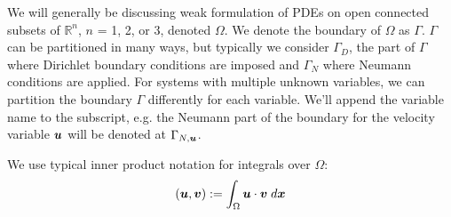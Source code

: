 We will generally be discussing weak formulation of PDEs on open
connected subsets of $\mathbb{R}^n$, $n$ = 1, 2, or 3, denoted
$\Omega$. We denote the boundary of $\Omega$ as $\Gamma$. $\Gamma$ can
be partitioned in many ways, but typically we consider $\Gamma_D$, the
part of $\Gamma$ where Dirichlet boundary conditions are imposed and
$\Gamma_N$ where Neumann conditions are applied. For systems with
multiple unknown variables, we can partition the boundary $\Gamma$
differently for each variable. We'll append the variable name to the
subscript, e.g. the Neumann part of the boundary for the velocity
variable $\boldsymbol{u}$ will be denoted at $\Gamma_{N,\boldsymbol{u}}$.

We use typical inner product notation for integrals over $\Omega$:
%
\begin{equation}
\left( \boldsymbol{u}, \boldsymbol{v} \right) := \int_{\Omega} \boldsymbol{u} \cdot \boldsymbol{v} \; d\boldsymbol{x}
\end{equation}
%
